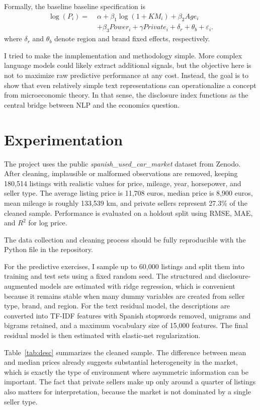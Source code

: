 \documentclass[10pt,twocolumn]{article}
\begin{document}
Formally, the baseline baseline specification is
\[
\begin{aligned}
\log(P_i) =\;& \alpha + \beta_1 \log(1+KM_i) + \beta_2 Age_i \\
&+ \beta_3 Power_i + \gamma Private_i + \delta_r + \theta_b + \varepsilon_i .
\end{aligned}
\]
where $\delta_r$ and $\theta_b$ denote region and brand fixed effects, respectively.


I tried to make the inmplementation and methodology simple. More complex language models could likely extract additional signals, but the objective here is not to maximize raw predictive performance at any cost. Instead, the goal is to show that even relatively simple text representations can operationalize a concept from microeconomic theory. In that sense, the disclosure index functions as the central bridge between NLP and the economics question.

\section{Experimentation}
The project uses the public \textit{spanish\_used\_car\_market} dataset from Zenodo. After cleaning, implausible or malformed observations are removed, keeping 180{,}514 listings with realistic values for price, mileage, year, horsepower, and seller type. The average listing price is 11{,}708 euros, median price is 8{,}900 euros, mean mileage is roughly 133{,}539 km, and private sellers represent 27.3\% of the cleaned sample. Performance is evaluated on a holdout split using RMSE, MAE, and $R^2$ for log price.

The data collection and cleaning process should be fully reproducible with the Python file in the repository.

For the predictive exercises, I sample up to 60{,}000 listings and split them into training and test sets using a fixed random seed. The structured and disclosure-augmented models are estimated with ridge regression, which is convenient because it remains stable when many dummy variables are created from seller type, brand, and region. For the text residual model, the descriptions are converted into TF-IDF features with Spanish stopwords removed, unigrams and bigrams retained, and a maximum vocabulary size of 15{,}000 features. The final residual model is then estimated with elastic-net regularization.

Table~\ref{tab:desc} summarizes the cleaned sample. The difference between mean and median prices already suggests substantial heterogeneity in the market, which is exactly the type of environment where asymmetric information can be important. The fact that private sellers make up only around a quarter of listings also matters for interpretation, because the market is not dominated by a single seller type.
\end{document}
